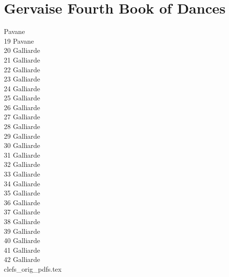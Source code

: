 \documentclass[11pt]{book}
\begin{document}

\pagestyle{fancy}

\fancyhf{}

\fancyhead[LE,RO]{\thepage}
\renewcommand{\headrulewidth}{0pt}
\renewcommand{\footrulewidth}{0pt}
\setlength{\parindent}{0pt}
\setlength{\parskip}{11pt plus 2pt minus 4pt}

\mainmatter
\section*{Gervaise Fourth Book of Dances}
 Pavane \dotfill \pageref{01_pavane} \\
19 Pavane \dotfill \pageref{19_pavane} \\
20 Galliarde \dotfill \pageref{20_galliarde} \\
21 Galliarde\dotfill \pageref{21_galliarde} \\
22 Galliarde\dotfill \pageref{22_galliarde} \\
23 Galliarde\dotfill \pageref{23_galliarde} \\
24 Galliarde\dotfill \pageref{24_galliarde} \\
25 Galliarde\dotfill \pageref{25_galliarde} \\
26 Galliarde\dotfill \pageref{26_galliarde} \\
27 Galliarde\dotfill \pageref{27_galliarde} \\
28 Galliarde\dotfill \pageref{28_galliarde} \\
29 Galliarde\dotfill \pageref{29_galliarde} \\
30 Galliarde\dotfill \pageref{30_galliarde} \\
31 Galliarde\dotfill \pageref{31_galliarde} \\
32 Galliarde\dotfill \pageref{32_galliarde} \\
33 Galliarde\dotfill \pageref{33_galliarde} \\
34 Galliarde\dotfill \pageref{34_galliarde} \\
35 Galliarde\dotfill \pageref{35_galliarde} \\
36 Galliarde\dotfill \pageref{36_galliarde} \\
37 Galliarde\dotfill \pageref{37_galliarde} \\
38 Galliarde\dotfill \pageref{38_galliarde} \\
39 Galliarde\dotfill \pageref{39_galliarde} \\
40 Galliarde\dotfill \pageref{40_galliarde} \\
41 Galliarde\dotfill \pageref{41_galliarde} \\
42 Galliarde\dotfill \pageref{42_galliarde} \\
 {clefs_orig_pdfs.tex}
\end{document}
